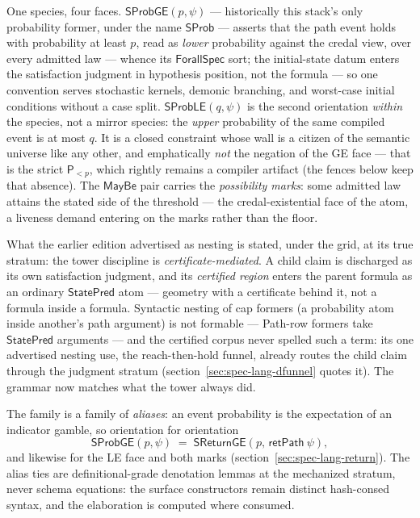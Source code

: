 One species, four faces. $\mathsf{SProbGE}(p, \psi)$ --- historically
this stack's only probability former, under the name $\mathsf{SProb}$
--- asserts that the path event holds with
probability at least $p$, read as \emph{lower} probability against
the credal view, over every admitted law --- whence its
$\mathsf{ForallSpec}$ sort; the initial-state datum enters the
satisfaction judgment in hypothesis position, not the formula ---
so one convention serves stochastic kernels, demonic
branching, and worst-case initial conditions without a case split.
$\mathsf{SProbLE}(q, \psi)$ is the second orientation \emph{within}
the species, not a mirror species: the \emph{upper} probability of
the same compiled event is at most $q$. It is a closed constraint
whose wall is a citizen of the semantic universe like any other, and
emphatically \emph{not} the negation of the GE face --- that is the
strict $\mathsf{P}_{< p}$, which rightly remains a compiler artifact
(the fences below keep that absence). The $\mathsf{MayBe}$ pair
carries the \emph{possibility marks}: some admitted law attains the
stated side of the threshold --- the credal-existential face of the
atom, a liveness demand entering on the marks rather than the floor.

What the earlier edition advertised as nesting is stated, under the
grid, at its true stratum: the tower discipline is
\emph{certificate-mediated}. A child claim is discharged as its own
satisfaction judgment, and its \emph{certified region} enters the
parent formula as an ordinary $\mathsf{StatePred}$ atom --- geometry
with a certificate behind it, not a formula inside a formula.
Syntactic nesting of cap formers (a probability atom inside another's
path argument) is not formable --- Path-row formers take
$\mathsf{StatePred}$ arguments --- and the certified corpus never
spelled such a term: its one advertised nesting use, the
reach-then-hold funnel, already routes the child claim through the
judgment stratum (section~\ref{sec:spec-lang-dfunnel} quotes it).
The grammar now matches what the tower always did.

The family is a family of \emph{aliases}: an event probability is
the expectation of an indicator gamble, so orientation for
orientation
\[
\mathsf{SProbGE}(p, \psi) \;=\;
\mathsf{SReturnGE}(p,\, \mathsf{retPath}\ \psi),
\]
and likewise for the LE face and both marks
(section~\ref{sec:spec-lang-return}). The alias ties are
definitional-grade denotation lemmas at the mechanized stratum,
never schema equations: the surface constructors remain distinct
hash-consed syntax, and the elaboration is computed where consumed.

